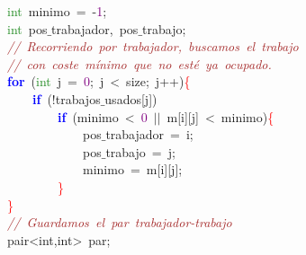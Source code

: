 \mbox{}\ \ \ \ \ \ \ \ \textcolor{ForestGreen}{int}\ minimo\ \textcolor{BrickRed}{=}\ \textcolor{BrickRed}{-}\textcolor{Purple}{1}\textcolor{BrickRed}{;} \\
\mbox{}\ \ \ \ \ \ \ \ \textcolor{ForestGreen}{int}\ pos$\_$trabajador\textcolor{BrickRed}{,}\ pos$\_$trabajo\textcolor{BrickRed}{;}\  \\
\mbox{}\ \ \ \ \ \ \ \ \textit{\textcolor{Brown}{//\ Recorriendo\ por\ trabajador,\ buscamos\ el\ trabajo\ }} \\
\mbox{}\ \ \ \ \ \ \ \ \textit{\textcolor{Brown}{//\ con\ coste\ mínimo\ que\ no\ esté\ ya\ ocupado.}} \\
\mbox{}\ \ \ \ \ \ \ \ \textbf{\textcolor{Blue}{for}}\ \textcolor{BrickRed}{(}\textcolor{ForestGreen}{int}\ j\ \textcolor{BrickRed}{=}\ \textcolor{Purple}{0}\textcolor{BrickRed}{;}\ j\ \textcolor{BrickRed}{\textless{}}\ size\textcolor{BrickRed}{;}\ j\textcolor{BrickRed}{++)}\textcolor{Red}{\{} \\
\mbox{}\ \ \ \ \ \ \ \ \ \ \ \ \textbf{\textcolor{Blue}{if}}\ \textcolor{BrickRed}{(!}trabajos$\_$usados\textcolor{BrickRed}{[}j\textcolor{BrickRed}{])}\  \\
\mbox{}\ \ \ \ \ \ \ \ \ \ \ \ \ \ \ \ \textbf{\textcolor{Blue}{if}}\ \textcolor{BrickRed}{(}minimo\ \textcolor{BrickRed}{\textless{}}\ \textcolor{Purple}{0}\ \textcolor{BrickRed}{$|$$|$}\ m\textcolor{BrickRed}{[}i\textcolor{BrickRed}{][}j\textcolor{BrickRed}{]}\ \textcolor{BrickRed}{\textless{}}\ minimo\textcolor{BrickRed}{)}\textcolor{Red}{\{} \\
\mbox{}\ \ \ \ \ \ \ \ \ \ \ \ \ \ \ \ \ \ \ \ pos$\_$trabajador\ \textcolor{BrickRed}{=}\ i\textcolor{BrickRed}{;} \\
\mbox{}\ \ \ \ \ \ \ \ \ \ \ \ \ \ \ \ \ \ \ \ pos$\_$trabajo\ \textcolor{BrickRed}{=}\ j\textcolor{BrickRed}{;}\  \\
\mbox{}\ \ \ \ \ \ \ \ \ \ \ \ \ \ \ \ \ \ \ \ minimo\ \textcolor{BrickRed}{=}\ m\textcolor{BrickRed}{[}i\textcolor{BrickRed}{][}j\textcolor{BrickRed}{];}\  \\
\mbox{}\ \ \ \ \ \ \ \ \ \ \ \ \ \ \ \ \textcolor{Red}{\}}\ \ \ \  \\
\mbox{}\ \ \ \ \ \ \ \ \textcolor{Red}{\}} \\
\mbox{}\ \ \ \ \ \ \ \ \textit{\textcolor{Brown}{//\ Guardamos\ el\ par\ trabajador-trabajo}} \\
\mbox{}\ \ \ \ \ \ \ \ \textcolor{TealBlue}{pair\textless{}int,int\textgreater{}}\ par\textcolor{BrickRed}{;}\  \\
